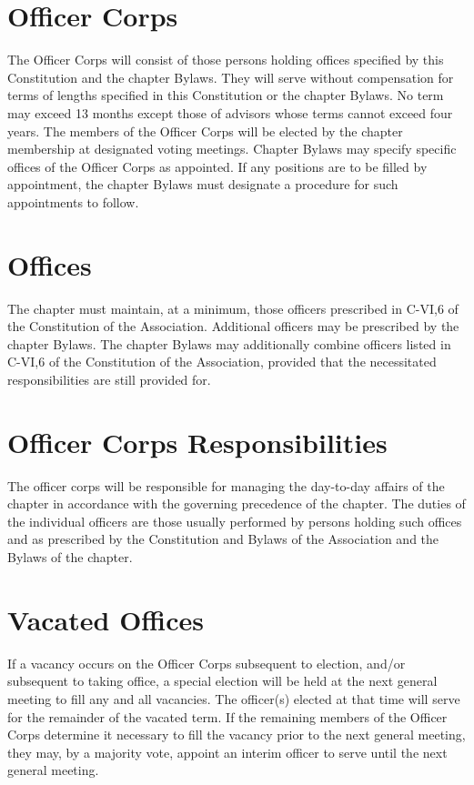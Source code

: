 \section{Officer Corps}
The Officer Corps will consist of those persons holding offices specified by this Constitution and the chapter Bylaws. They will serve without compensation for terms of lengths specified in this Constitution or the chapter Bylaws. No term may exceed 13 months except those of advisors whose terms cannot exceed four years. The members of the Officer Corps will be elected by the chapter membership at designated voting meetings. Chapter Bylaws may specify specific offices of the Officer Corps as appointed. If any positions are to be filled by appointment, the chapter Bylaws must designate a procedure for such appointments to follow.

\section{Offices} The chapter must maintain, at a minimum, those officers prescribed in C-VI,6 of the Constitution of the Association. Additional officers may be prescribed by the chapter Bylaws. The chapter Bylaws may additionally combine officers listed in C-VI,6 of the Constitution of the Association, provided that the necessitated responsibilities are still provided for.

\section{Officer Corps Responsibilities} The officer corps will be responsible for managing the day-to-day affairs of the chapter in accordance with the governing precedence of the chapter.  The duties of the individual officers are those usually performed by persons holding such offices and as prescribed by the Constitution and Bylaws of the Association and the Bylaws of the chapter.

\section{Vacated Offices} If a vacancy occurs on the Officer Corps subsequent to election, and/or subsequent to taking office, a special election will be held at the next general meeting to fill any and all vacancies. The officer(s) elected at that time will serve for the remainder of the vacated term. If the remaining members of the Officer Corps determine it necessary to fill the vacancy prior to the next general meeting, they may, by a majority vote, appoint an interim officer to serve until the next general meeting.

